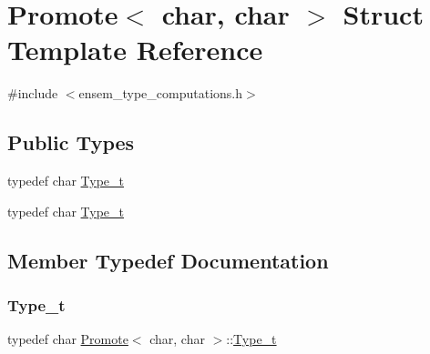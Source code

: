 \hypertarget{structPromote_3_01char_00_01char_01_4}{}\section{Promote$<$ char, char $>$ Struct Template Reference}
\label{structPromote_3_01char_00_01char_01_4}


{\ttfamily \#include $<$ensem\+\_\+type\+\_\+computations.\+h$>$}

\subsection*{Public Types}
\begin{DoxyCompactItemize}
\item 
typedef char \mbox{\hyperlink{structPromote_3_01char_00_01char_01_4_abf9ddff19f7af67343d88997bbe4d874}{Type\+\_\+t}}
\item 
typedef char \mbox{\hyperlink{structPromote_3_01char_00_01char_01_4_abf9ddff19f7af67343d88997bbe4d874}{Type\+\_\+t}}
\end{DoxyCompactItemize}


\subsection{Member Typedef Documentation}
\mbox{\label{structPromote_3_01char_00_01char_01_4_abf9ddff19f7af67343d88997bbe4d874}} 
\subsubsection{\texorpdfstring{Type\_t}{Type\_t}\hspace{0.1cm}{\footnotesize\ttfamily [1/2]}}
{\footnotesize\ttfamily typedef char \mbox{\hyperlink{structPromote}{Promote}}$<$ char, char $>$\+::\mbox{\hyperlink{structPromote_3_01char_00_01char_01_4_abf9ddff19f7af67343d88997bbe4d874}{Type\+\_\+t}}}

\mbox{\label{structPromote_3_01char_00_01char_01_4_abf9ddff19f7af67343d88997bbe4d874}} 
